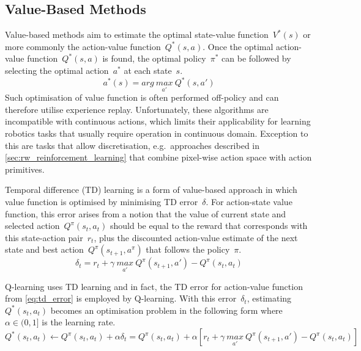 \subsection{Value-Based Methods}

Value-based methods aim to estimate the optimal state-value function~\(V^{*}(s)\) or more commonly the action-value function~\(Q^{*}(s, a)\). Once the optimal action-value function~\(Q^{*}(s, a)\) is found, the optimal policy~\(\pi^{*}\) can be followed by selecting the optimal action~\(a^{*}\) at each state~\(s\).
\begin{equation}
    a^{*}(s) = arg\ \underset{a'}{max}\ Q^{*}(s, a')
\end{equation}
Such optimisation of value function is often performed off-policy and can therefore utilise experience replay. Unfortunately, these algorithms are incompatible with continuous actions, which limits their applicability for learning robotics tasks that usually require operation in continuous domain. Exception to this are tasks that allow discretisation, e.g.~approaches described in \autoref{sec:rw_reinforcement_learning} that combine pixel-wise action space with action primitives.

Temporal difference (TD) learning is a form of value-based approach in which value function is optimised by minimising TD error~\(\delta\). For action-state value function, this error arises from a notion that the value of current state and selected action~\(Q^{\pi}(s_{t}, a_{t})\) should be equal to the reward that corresponds with this state-action pair~\(r_{t}\), plus the discounted action-value estimate of the next state and best action~\(Q^{\pi}(s_{t+1}, a^{\pi})\) that follows the policy~\(\pi\).
\begin{equation}
    \delta_{t} = r_{t} + \gamma\ \underset{a'}{max}\ Q^{\pi}(s_{t+1}, a') - Q^{\pi}(s_{t}, a_{t})
    \label{eq:td_error}
\end{equation}

Q-learning uses TD learning and in fact, the TD error for action-value function from \autoref{eq:td_error} is employed by Q-learning. With this error~\(\delta_{t}\), estimating~\(Q^{*}(s_{t}, a_{t})\) becomes an optimisation problem in the following form where~\(\alpha \in (0, 1]\) is the learning rate.
\begin{equation}
    Q^{*}(s_{t}, a_{t}) \leftarrow Q^{\pi}(s_{t}, a_{t}) + \alpha\delta_{t} = Q^{\pi}(s_{t}, a_{t}) + \alpha \left[ r_{t} + \gamma\ \underset{a'}{max}\ Q^{\pi}(s_{t+1}, a') - Q^{\pi}(s_{t}, a_{t}) \right]
\end{equation}

